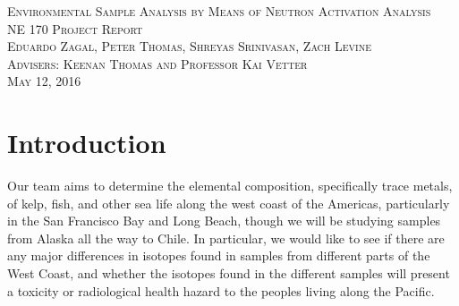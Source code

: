 \documentclass[]{article}
\begin{document}
\doublespacing
{}

\begin{titlepage}
\null{}
\begin{center}
\textsc{\LARGE Environmental Sample Analysis by Means of Neutron Activation Analysis}\\[1.5cm]

\textsc{\Large NE 170 Project Report}\\[0.5cm]
\textsc{\Large Eduardo Zagal, Peter Thomas, Shreyas Srinivasan, Zach Levine}\\[0.5cm] %
\textsc{\Large Advisers: Keenan Thomas and Professor Kai Vetter}\\[0.5cm]
\textsc{\Large May 12, 2016}\\[0.5cm] %
\end{center}
\end{titlepage}
\pagebreak


\tableofcontents

\pagebreak


\singlespacing

\section{Introduction}
Our team aims to determine the elemental composition, specifically trace metals, of kelp, fish, and other sea life along the west coast of the Americas, particularly in the San Francisco Bay and Long Beach, though we will be studying samples from Alaska all the way to Chile. In particular, we would like to see if there are any major differences in isotopes found in samples from different parts of the West Coast, and whether the isotopes found in the different samples will present a toxicity or radiological health hazard to the peoples living along the Pacific.
\end{document}
